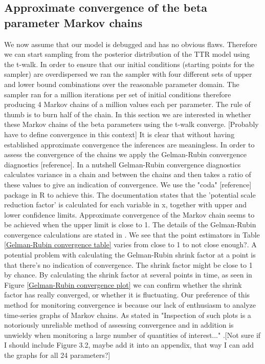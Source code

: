 \documentclass[paper=a4, fontsize=11pt]{scrartcl}
\numberwithin{equation}{section}		%
\numberwithin{figure}{section}			%
\numberwithin{table}{section}				%
\begin{document}
\subsection{Approximate convergence of the beta parameter Markov chains}
We now assume that our model is debugged and has no obvious flaws. Therefore we can start sampling from the posterior distribution of the TTR model using the t-walk. In order to ensure that our initial conditions (starting points for the sampler) are overdispersed we ran the sampler with four different sets of upper and lower bound combinations over the reasonable parameter domain.
The sampler ran for a million iterations per set of initial conditions therefore producing 4 Markov chains of a million values each per parameter. The rule of thumb is to burn half of the chain.  In this section we are interested in whether these Markov chains of the beta parameters using the t-walk converge. [Probably have to define convergence in this context] It is clear that without having established approximate convergence the inferences are meaningless.  In order to assess the convergence of the chains we apply the Gelman-Rubin convergence diagnostics [reference]. In a nutshell Gelman-Rubin convergence diagnostics calculates variance in a chain and between the chains and then takes a ratio of these values to give an indication of convergence. 
We use the "coda" [reference] package in R to achieve this. The documentation states that the 'potential scale reduction factor' is calculated for each variable in x, together with upper and lower confidence limits. Approximate convergence of the Markov chain seems to be achieved when the upper limit is close to 1. 
The details of the Gelman-Rubin convergence calculations are stated in \cite{GelmanBayesianAnalysis}. We see that the point estimators in Table \ref{Gelman-Rubin convergence table} varies from close to 1 to not close enough?. A potential problem with calculating the Gelman-Rubin shrink factor   at a point is that there's no indication of convergence. The shrink factor might be close to 1 by chance. By calculating the shrink factor at several points in time, as seen in Figure \ref{Gelman-Rubin convergence plot} we can confirm whether the shrink factor has really converged, or whether it is fluctuating. Our preference of this method for monitoring convergence is because our lack of enthusiasm to analyze time-series graphs of Markov chains. As stated in \cite{GelmanBayesianAnalysis} "Inspection of such plots is a notoriously unreliable method of assessing convergence and in addition is unwieldy when monitoring a large number of quantities of interest..."  .[Not sure if I should include Figure 3.2, maybe add it into an appendix, that way I can add the graphs for all 24 parameters?]
\end{document}
